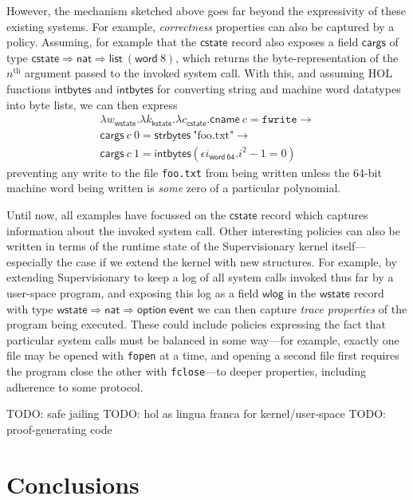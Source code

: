\documentclass[a4paper, UKenglish, cleveref, autoref, thm-restate, colorlinks]{lipics-v2021}
\newcommand{\todo}[1]{}
\renewcommand{\todo}[1]{{\color{red} TODO: {#1}}}
\newcommand{\eps}[1]{\epsilon{#1}.}
\newcommand{\lam}[1]{\lambda{#1}.}
\begin{document}
However, the mechanism sketched above goes far beyond the expressivity of these existing systems.
For example, \emph{correctness} properties can also be captured by a policy.
Assuming, for example that the $\mathsf{cstate}$ record also exposes a field $\mathsf{cargs}$ of type $\mathsf{cstate} \Rightarrow \mathsf{nat} \Rightarrow \mathsf{list}\ (\mathsf{word}\ 8)$, which returns the byte-representation of the $n^\mathrm{th}$ argument passed to the invoked system call.
With this, and assuming HOL functions $\mathsf{intbytes}$ and $\mathsf{intbytes}$ for converting string and machine word datatypes into byte lists, we can then express
\begin{gather*}
\lam{w_{\mathsf{wstate}}}\lam{k_{\mathsf{kstate}}}\lam{c_{\mathsf{cstate}}}\mathsf{cname}\ c = \mathtt{fwrite} \longrightarrow \\
\mathsf{cargs}\ c\ 0 = \mathsf{strbytes}\ \text{"foo.txt"} \longrightarrow \\
\mathsf{cargs}\ c\ 1 = \mathsf{intbytes}(\eps{i_\mathsf{word\ 64}}i^2 - 1 = 0)
\end{gather*}
preventing any write to the file \texttt{foo.txt} from being written unless the 64-bit machine word being written is \emph{some} zero of a particular polynomial.

Until now, all examples have focussed on the $\mathsf{cstate}$ record which captures information about the invoked system call.
Other interesting policies can also be written in terms of the runtime state of the Supervisionary kernel itself---especially the case if we extend the kernel with new structures.
For example, by extending Supervisionary to keep a log of all system calls invoked thus far by a user-space program, and exposing this log as a field $\mathsf{wlog}$ in the $\mathsf{wstate}$ record with type $\mathsf{wstate} \Rightarrow \mathsf{nat} \Rightarrow \mathsf{option}\ \mathsf{event}$ we can then capture \emph{trace properties} of the program being executed.
These could include policies expressing the fact that particular system calls must be balanced in some way---for example, exactly one file may be opened with \texttt{fopen} at a time, and opening a second file first requires the program close the other with \texttt{fclose}---to deeper properties, including adherence to some protocol.

\todo{safe jailing}
\todo{hol as lingua franca for kernel/user-space}
\todo{proof-generating code}

\section{Conclusions}
\label{sect.conclusions}
\end{document}
